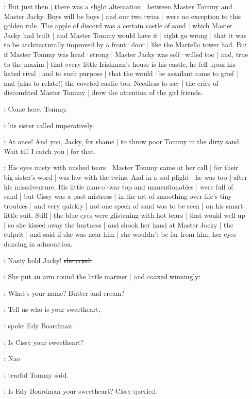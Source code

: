 \Nnovel:
But just then |
there was a slight altercation |%
between Master Tommy and Master Jacky.
Boys will be boys |
and our two twins |
were no exception to this golden rule.
The apple of discord was a certain castle of sand |
which Master Jacky had built |
and Master Tommy would have it |
right go wrong |
that it was to be architecturally improved
by a front·door |
like the Martello tower had.
But if Master Tommy was head·strong |
Master Jacky was self·willed too |
and,
true to the maxim |
that every little Irishman's house is his castle,
he fell upon his hated rival |
and to such purpose |
that the would·be assailant came to grief |
and
(alas to relate!)
the coveted castle too.
Needless to say |
the cries of discomfited Master Tommy |
drew the attention of the girl friends.%

\cissy:
Come here,
Tommy.

:
his sister called imperatively.

\cissy:
At once!
And you,
Jacky,
for shame |
to throw poor Tommy in the dirty sand.
Wait till I catch you |
for that.

\Nnovel:
His eyes misty with unshed tears |
Master Tommy came at her call |
for their big sister's word |
was law with the twins.
And in a sad plight |
he was too |
after his misadventure.
His little man-o'-war top and unmentionables |
were full of sand |
but Cissy was a past mistress |
in the art of smoothing over life's tiny troubles |
and very quickly |
not one speck of sand was to be seen |
on his smart little suit.
Still |
the blue eyes were glistening with hot tears |
that would well up |
so she kissed away
the hurtness |
and shook her hand at Master Jacky |
the culprit |
and said if she was near him |
she wouldn't be far from him,
her eyes dancing in admonition.

\cissy:
Nasty bold Jacky!
\sout{she cried.}

:
She put an arm round the little mariner |
and coaxed winningly:

\cissy:
What's your name?
Butter and cream?

\edy:
Tell us who is your sweetheart,

:
spoke Edy Boardman.

\edy:
Is Cissy your sweetheart?

\tommy:
Nao
\stage{[tearfully]}

:
tearful Tommy said.

\cissy:
Is Edy Boardman your sweetheart?
\sout{Cissy queried.}

